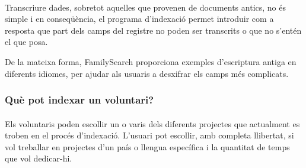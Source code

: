         \paragraph{}
        Transcriure dades, sobretot aquelles que provenen de documents antics, no és simple i en conseqüència, el programa d’indexació permet introduir com a resposta que part dels camps del registre no poden ser transcrits o que no s'entén el que posa.

        De la mateixa forma, FamilySearch proporciona exemples d’escriptura antiga en diferents idiomes, per ajudar als usuaris a desxifrar els camps més complicats.


    \subsubsection{Què pot indexar un voluntari?}

        \paragraph{}
        Els voluntaris poden escollir un o varis dels diferents projectes que actualment es troben en el procés d’indexació. L’usuari pot escollir, amb completa llibertat, si vol treballar en projectes d’un país o llengua específica i la quantitat de temps que vol dedicar-hi.
